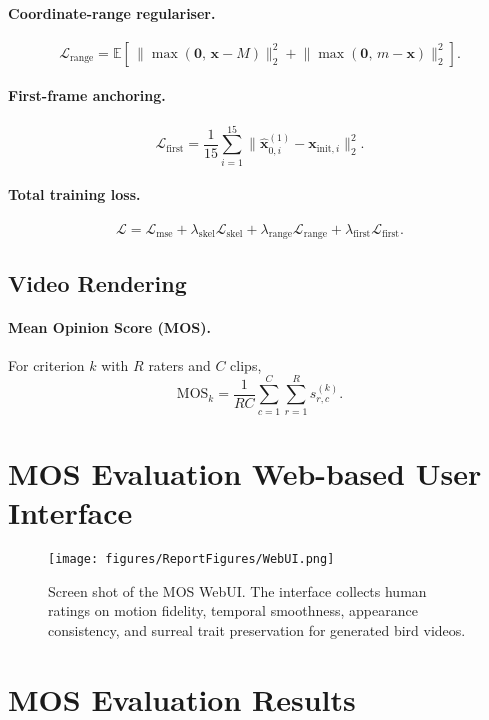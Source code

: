 \documentclass[final-report]{report-template}
\begin{document}
\paragraph{Coordinate-range regulariser.}
\[
\mathcal{L}_{\text{range}}
=\mathbb{E}\!\left[\,
\big\lVert \max(\mathbf{0},\,\mathbf{x}-M)\big\rVert_2^2
+
\big\lVert \max(\mathbf{0},\,m-\mathbf{x})\big\rVert_2^2
\right].
\]

\paragraph{First-frame anchoring.}
\[
\mathcal{L}_{\text{first}}
=\frac{1}{15}\sum_{i=1}^{15}\big\lVert \hat{\mathbf{x}}_{0,i}^{(1)}-\mathbf{x}_{\text{init},i}\big\rVert_2^2 .
\]

\paragraph{Total training loss.}
\[
\mathcal{L}
= \mathcal{L}_{\text{mse}}
+ \lambda_{\text{skel}}\mathcal{L}_{\text{skel}}
+ \lambda_{\text{range}}\mathcal{L}_{\text{range}}
+ \lambda_{\text{first}}\mathcal{L}_{\text{first}}.
\]

\subsection{Video Rendering}
\paragraph{Mean Opinion Score (MOS).}
For criterion $k$ with $R$ raters and $C$ clips,
\[
\mathrm{MOS}_k=\frac{1}{RC}\sum_{c=1}^{C}\sum_{r=1}^{R}s_{r,c}^{(k)}.
\]


\section{MOS Evaluation Web-based User Interface}
\label{appendix: WebUI}
\begin{figure}[h]
    \centering
    \texttt{[image: figures/ReportFigures/WebUI.png]}
    \caption{Screen shot of the MOS WebUI. The interface collects human ratings on motion fidelity, temporal smoothness, appearance consistency, and surreal trait preservation for generated bird videos.}
    \label{fig:webui}
\end{figure}


\section{MOS Evaluation Results}
\label{appendix: MOS}
\end{document}
